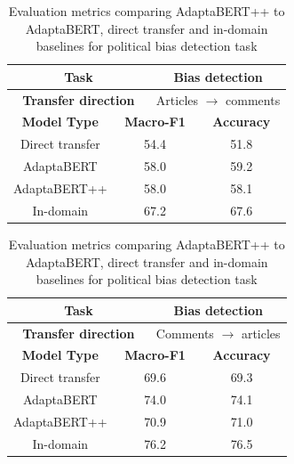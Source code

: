 \begin{table}[ht]
    \begin{center}
        \begin{tabular}{|c|c|c|c|c|c|}
            \hline
            \multicolumn{3}{|c|}{\textbf{Task}} & \multicolumn{3}{|c|}{Bias detection} \\
            \hline
            \multicolumn{3}{|c|}{\textbf{Transfer direction}} & \multicolumn{3}{|c|}{Articles $ \rightarrow $ comments} \\
            \hline \hline
            \multicolumn{2}{|c|}{\textbf{Model Type}} & \multicolumn{2}{|c|}{\textbf{Macro-F1}} & \multicolumn{2}{|c|}{\textbf{Accuracy}} \\
            \hline
            \multicolumn{2}{|c|}{Direct transfer} & \multicolumn{2}{|c|}{54.4} & \multicolumn{2}{|c|}{51.8} \\
            \multicolumn{2}{|c|}{AdaptaBERT} & \multicolumn{2}{|c|}{58.0} & \multicolumn{2}{|c|}{59.2} \\
            \multicolumn{2}{|c|}{AdaptaBERT++} & \multicolumn{2}{|c|}{58.0} & \multicolumn{2}{|c|}{58.1} \\
            \hline
            \multicolumn{2}{|c|}{In-domain} & \multicolumn{2}{|c|}{67.2} & \multicolumn{2}{|c|}{67.6} \\
            \hline
        \end{tabular}
    \end{center} \vspace{10pt}
    \begin{center}
        \begin{tabular}{|c|c|c|c|c|c|}
            \hline
            \multicolumn{3}{|c|}{\textbf{Task}} & \multicolumn{3}{|c|}{Bias detection} \\
            \hline
            \multicolumn{3}{|c|}{\textbf{Transfer direction}} & \multicolumn{3}{|c|}{Comments $ \rightarrow $ articles} \\
            \hline \hline
            \multicolumn{2}{|c|}{\textbf{Model Type}} & \multicolumn{2}{|c|}{\textbf{Macro-F1}} & \multicolumn{2}{|c|}{\textbf{Accuracy}} \\
            \hline
            \multicolumn{2}{|c|}{Direct transfer} & \multicolumn{2}{|c|}{69.6} & \multicolumn{2}{|c|}{69.3}  \\
            \multicolumn{2}{|c|}{AdaptaBERT} & \multicolumn{2}{|c|}{74.0} & \multicolumn{2}{|c|}{74.1} \\
            \multicolumn{2}{|c|}{AdaptaBERT++} & \multicolumn{2}{|c|}{70.9} & \multicolumn{2}{|c|}{71.0} \\
            \hline
            \multicolumn{2}{|c|}{In-domain} & \multicolumn{2}{|c|}{76.2} & \multicolumn{2}{|c|}{76.5}  \\
            \hline
        \end{tabular}
    \end{center}
    \caption{Evaluation metrics comparing AdaptaBERT++ to AdaptaBERT, direct transfer and in-domain baselines for political bias detection task}
    \label{tab:adaptabert-nsp-results}
\end{table}

